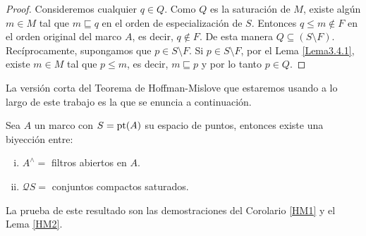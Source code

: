 \begin{proof}
    Consideremos cualquier $q\in Q$. Como $Q$ es la saturación de $M$, existe algún $m\in M$ tal que $m\sqsubseteq q$ en el orden de especialización de $S$. Entonces $q\leq m\notin F$ en el orden original del marco $A$, es decir, $q\notin F$. De esta manera $Q\subseteq (S\setminus F)$.\\

    Recíprocamente, supongamos que $p\in S\setminus F$. Si $p\in S\setminus F$, por el Lema \ref{Lema3.4.1}, existe $m\in M$ tal que $p\leq m$, es decir, $m\sqsubseteq p$ y por lo tanto $p\in Q$.
\end{proof}

La versión corta del Teorema de Hoffman-Mislove que estaremos usando a lo largo de este trabajo es la que se enuncia a continuación.

\begin{thm}\label{TeoremaHM}

Sea $A$ un marco con $S=\mathrm{pt}(A)$ su espacio de puntos, entonces existe una biyección entre:

\begin{enumerate}[i)]

\item $A^{\wedge}=$ filtros abiertos en $A$.

\item $\mathcal{Q}S=$ conjuntos compactos saturados.

\end{enumerate}
\end{thm}

La prueba de este resultado son las demostraciones del Corolario \ref{HM1} y el Lema \ref{HM2}.



